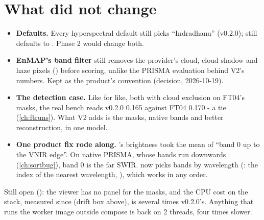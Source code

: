 \section{What did not change}\label{sec:shipping:unchanged}

\begin{itemize}
\item \textbf{Defaults.} Every hyperspectral default still picks ``Indradhanu'' (v0.2.0);  still
  defaults to . Phase 2 would change both.
\item \textbf{EnMAP's band filter} still removes the provider's cloud, cloud-shadow and haze pixels
  () before scoring, unlike the PRISMA evaluation behind V2's numbers. Kept as the product's
  convention (decision, 2026-10-19).
\item \textbf{The detection case.} Like for like, both with cloud exclusion on FT04's masks, the real bench reads v0.2.0
  0.165 against FT04 0.170 - a tie (\cref{ch:ftruns}). What V2 adds is the masks, native bands and better
  reconstruction, in one model.
\item \textbf{One product fix rode along.} 's brightness took the mean of ``band 0 up to the VNIR
  edge''. On native PRISMA, whose bands run downwards (\cref{ch:sortbug}), band 0 is the far SWIR.
   now picks bands by wavelength (: the index of the
  nearest wavelength, ), which works in any order.
\end{itemize}

Still open (): the viewer has no panel for the masks, and the CPU cost on the stack, measured
since (drift box above), is several times v0.2.0's. Anything that runs the worker image outside compose is back on 2
threads, four times slower.


